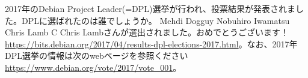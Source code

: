 %

\santaku
{2017年のDebian Project Leader(=DPL)選挙が行われ、投票結果が発表されました。DPLに選ばれたのは誰でしょうか。}
{Mehdi Dogguy}
{Nobuhiro Iwamatsu}
{Chris Lamb}
{C}
{Chris Lambさんが選出されました。おめでとうございます！\url{https://bits.debian.org/2017/04/results-dpl-elections-2017.html}。なお、2017年DPL選挙の情報は次のwebページを参照ください\url{https://www.debian.org/vote/2017/vote_001}。}
